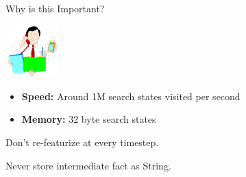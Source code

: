 \def\title{Why is this Important?}
\begin{frame}{\title}
\begin{center}
\includegraphics[height=2cm]{../img/efficient.png}
\end{center}

\begin{itemize}
\item \textbf{Speed:} Around 1M search states visited per second
\item \textbf{Memory:} 32 byte search states
\end{itemize}
\vspace{2ex}

 Don't re-featurize at every timestep.
\vspace{2ex}

 Never store intermediate fact as String.
\end{frame}



\def\title{Another Example Search}

